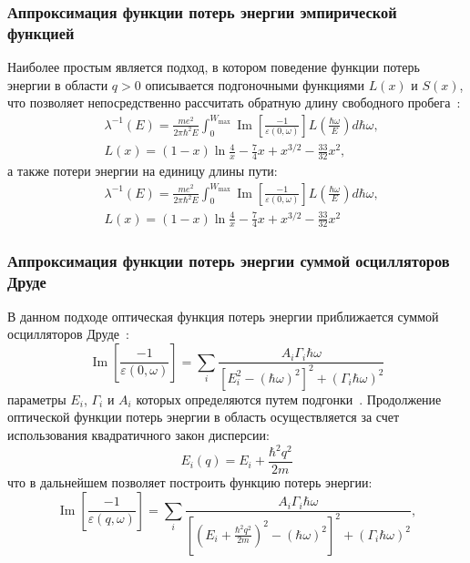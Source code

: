 \subsubsection{Аппроксимация функции потерь энергии эмпирической функцией}
Наиболее простым является подход, в котором поведение функции потерь энергии в области $q > 0$ описывается подгоночными функциями $L(x)$ и $S(x)$, что позволяет непосредственно рассчитать обратную длину свободного пробега~\cite{Ashley_LxSx}:
\begin{equation}
	\begin{aligned}
		&\lambda^{-1}(E)=\frac{m e^2}{2 \pi \hbar^2 E} \int_0^{W_{\max }} \operatorname{Im}\left[\frac{-1}{\varepsilon(0, \omega)}\right] L\left(\frac{\hbar \omega}{E}\right) d \hbar \omega, \\
		&L(x)=(1-x) \ln \frac{4}{x}-\frac{7}{4} x+x^{3 / 2}-\frac{33}{32} x^2,
	\end{aligned}
\end{equation}
а также потери энергии на единицу длины пути:
\begin{equation}
	\begin{aligned}
		&\lambda^{-1}(E)=\frac{m e^2}{2 \pi \hbar^2 E} \int_0^{W_{\max }} \operatorname{Im}\left[\frac{-1}{\varepsilon(0, \omega)}\right] L\left(\frac{\hbar \omega}{E}\right) d \hbar \omega, \\
		&L(x)=(1-x) \ln \frac{4}{x}-\frac{7}{4} x+x^{3 / 2}-\frac{33}{32} x^2
	\end{aligned}
\end{equation}


\subsubsection{Аппроксимация функции потерь энергии суммой осцилляторов Друде}
В данном подходе оптическая функция потерь энергии приближается суммой осцилляторов Друде~\cite{Ritchie_Drude}:
\begin{equation}
	\operatorname{Im}\left[\frac{-1}{\varepsilon(0, \omega)}\right]=\sum_i \frac{A_i \Gamma_i \hbar \omega}{\left[E_i^2-(\hbar \omega)^2\right]^2+\left(\Gamma_i \hbar \omega\right)^2}
\end{equation}
параметры $E_i$, $\Gamma_i$ и $A_i$ которых определяются путем подгонки~\cite{Dapor_2015_oscillators}. Продолжение оптической функции потерь энергии в область осуществляется за счет использования квадратичного закон дисперсии:
\begin{equation}
	E_i(q)=E_i+\frac{\hbar^2 q^2}{2 m}
\end{equation}
что в дальнейшем позволяет построить функцию потерь энергии:
\begin{equation}
	\operatorname{Im}\left[\frac{-1}{\varepsilon(q, \omega)}\right]=\sum_i \frac{A_i \Gamma_i \hbar \omega}{\left[\left(E_i+\frac{\hbar^2 q^2}{2 m}\right)^2-(\hbar \omega)^2\right]^2+\left(\Gamma_i \hbar \omega\right)^2},
\end{equation}

